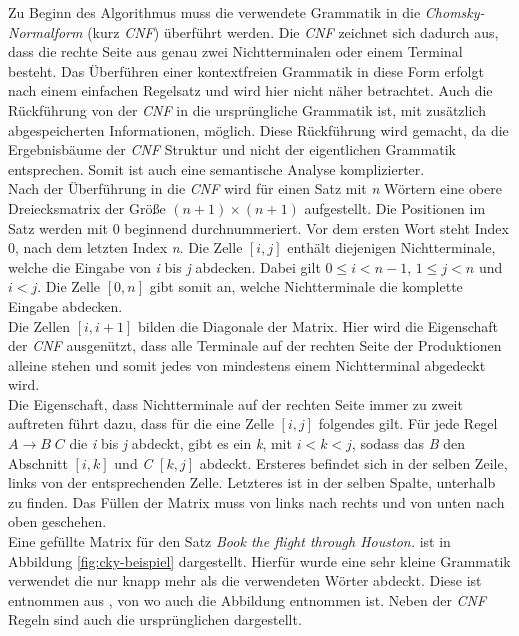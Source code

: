 Zu Beginn des Algorithmus muss die verwendete Grammatik in die \textit{Chomsky-Normalform} (kurz \textit{CNF}) überführt werden. Die \textit{CNF} zeichnet sich dadurch aus, dass die rechte Seite aus genau zwei Nichtterminalen oder einem Terminal besteht. Das Überführen einer kontextfreien Grammatik in diese Form erfolgt nach einem einfachen Regelsatz und wird hier nicht näher betrachtet. Auch die Rückführung von der \textit{CNF} in die ursprüngliche Grammatik ist, mit zusätzlich abgespeicherten Informationen, möglich. Diese Rückführung wird gemacht, da die Ergebnisbäume der \textit{CNF} Struktur und nicht der eigentlichen Grammatik entsprechen. Somit ist auch eine semantische Analyse komplizierter. \\
Nach der Überführung in die \textit{CNF} wird für einen Satz mit \textit{n} Wörtern eine obere Dreiecksmatrix der Größe \((n+1) \times (n+1) \) aufgestellt. Die Positionen im Satz werden mit 0 beginnend durchnummeriert. Vor dem ersten Wort steht Index 0, nach dem letzten Index \textit{n}. Die Zelle \([i, j]\) enthält diejenigen Nichtterminale, welche die Eingabe von \textit{i} bis \textit{j} abdecken. Dabei gilt \( 0 \leq i < n-1 \), \( 1 \leq j < n \) und \(i < j\). Die Zelle \([0, n]\) gibt somit an, welche Nichtterminale die komplette Eingabe abdecken.\\
Die Zellen \([i, i+1]\) bilden die Diagonale der Matrix. Hier wird die Eigenschaft der \textit{CNF} ausgenützt, dass alle Terminale auf der rechten Seite der Produktionen alleine stehen und somit jedes von mindestens einem Nichtterminal abgedeckt wird.\\
Die Eigenschaft, dass Nichtterminale auf der rechten Seite immer zu zweit auftreten führt dazu, dass für die eine Zelle \([i, j]\) folgendes gilt. Für jede Regel \( A \to B\;C \) die \textit{i} bis \textit{j} abdeckt, gibt es ein \textit{k}, mit \( i < k < j\), sodass das \textit{B} den Abschnitt \([i, k]\) und \textit{C} \([k, j]\) abdeckt. Ersteres befindet sich in der selben Zeile, links von der entsprechenden Zelle. Letzteres ist in der selben Spalte, unterhalb zu finden. Das Füllen der Matrix muss von links nach rechts und von unten nach oben geschehen.\\
Eine gefüllte Matrix für den Satz \textit{Book the flight through Houston.} ist in Abbildung \ref{fig:cky-beispiel} dargestellt. Hierfür wurde eine sehr kleine Grammatik verwendet die nur knapp mehr als die verwendeten Wörter abdeckt. Diese ist entnommen aus %
, von wo auch die Abbildung entnommen ist. Neben der \textit{CNF} Regeln sind auch die ursprünglichen dargestellt.

